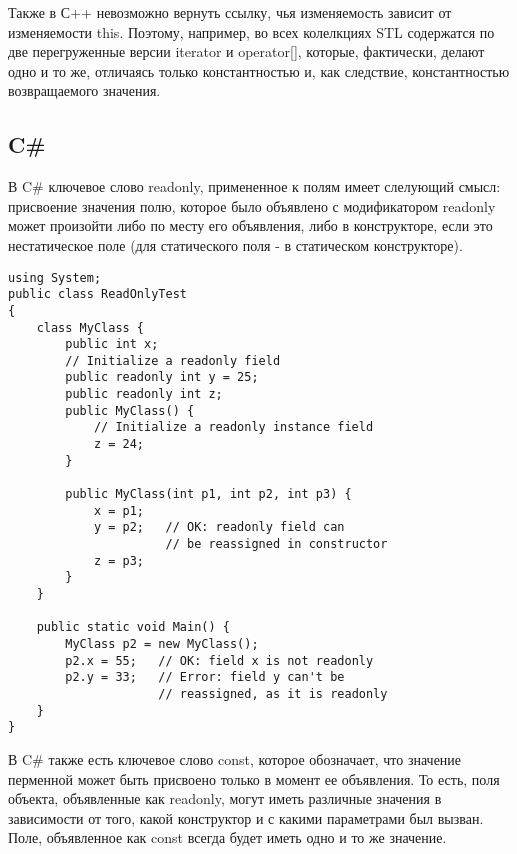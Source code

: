 Также в С++ невозможно вернуть ссылку, чья изменяемость зависит от изменяемости this. Поэтому, например, во всех колелкциях STL содержатся по две перегруженные версии iterator и operator[], которые, фактически, делают одно и то же, отличаясь только константностью и, как следствие, константностью возвращаемого значения.

\subsection{C\#}

В C\# ключевое слово readonly, примененное к полям имеет слелующий смысл: присвоение значения полю, которое было объявлено с модификатором readonly может произойти либо по месту его объявления, либо в конструкторе, если это нестатическое поле (для статического поля - в статическом конструкторе). 

\begin{lstlisting}[caption=Ключевое слово readonly в C\#, label=code:csharp_readonly]
using System;
public class ReadOnlyTest 
{
    class MyClass {
        public int x;
        // Initialize a readonly field
        public readonly int y = 25; 
        public readonly int z;
        public MyClass() {
            // Initialize a readonly instance field            
            z = 24;   
        }

        public MyClass(int p1, int p2, int p3) {
            x = p1; 
            y = p2;   // OK: readonly field can 
                      // be reassigned in constructor
            z = p3;
        }
    }

    public static void Main() {        
        MyClass p2 = new MyClass();
        p2.x = 55;   // OK: field x is not readonly
        p2.y = 33;   // Error: field y can't be 
                     // reassigned, as it is readonly      
    }
}	
\end{lstlisting}

В C\# также есть ключевое слово const, которое обозначает, что значение перменной может быть присвоено только в момент ее объявления. То есть, поля объекта, объявленные как readonly, могут иметь различные значения в зависимости от того, какой конструктор и с какими параметрами был вызван. Поле, объявленное как const всегда будет иметь одно и то же значение.

